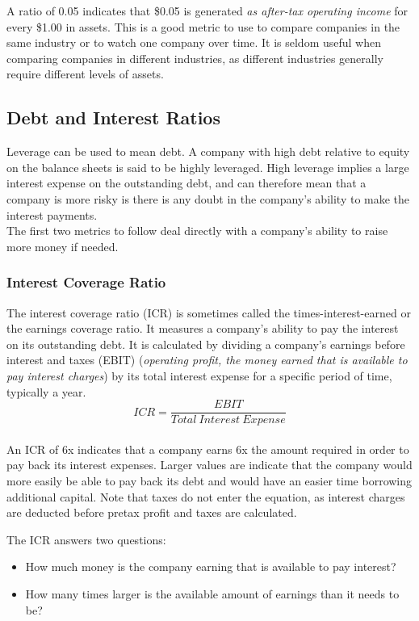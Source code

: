 \documentclass{article}
\begin{document}
A ratio of 0.05 indicates that \$0.05 is generated \textit{as after-tax operating income} for every \$1.00 in assets. This is a good metric to use to compare companies in the same industry or to watch one company over time. It is seldom useful when comparing companies in different industries, as different industries generally require different levels of assets.


\subsection{Debt and Interest Ratios}
Leverage can be used to mean debt. A company with high debt relative to equity on the balance sheets is said to be highly leveraged. High leverage implies a large interest expense on the outstanding debt, and can therefore mean that a company is more risky is there is any doubt in the company's ability to make the interest payments. \\

The first two metrics to follow deal directly with a company's ability to raise more money if needed. 

\subsubsection{Interest Coverage Ratio}
The interest coverage ratio (ICR) is sometimes called the times-interest-earned or the earnings coverage ratio. It measures a company's ability to pay the interest on its outstanding debt. It is calculated by dividing a company's earnings before interest and taxes (EBIT) (\textit{operating profit, the money earned that is available to pay interest charges}) by its total interest expense for a specific period of time, typically a year. \\

 \begin{equation}
    ICR = \frac{EBIT}{Total\: Interest\: Expense}
\end{equation}\\

An ICR of 6x indicates that a company earns 6x the amount required in order to pay back its interest expenses. Larger values are indicate that the company would more easily be able to pay back its debt and would have an easier time borrowing additional capital. Note that taxes do not enter the equation, as interest charges are deducted before pretax profit and taxes are calculated. 

The ICR answers two questions:
\begin{itemize}
\item How much money is the company earning that is available to pay interest?
\item How many times larger is the available amount of earnings than it needs to be?
\end{itemize}
\end{document}
